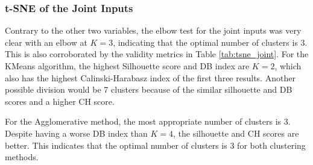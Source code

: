 
\subsubsection{t-SNE of the Joint Inputs}\label{sec:tsne_joint}
Contrary to the other two variables, the elbow test for the joint inputs was very clear with an elbow at $K=3$, indicating that the optimal number of clusters is 3. This is also corroborated by the validity metrics in Table \ref{tab:tsne_joint}. For the KMeans algorithm, the highest Silhouette score and DB index are $K=2$, which also has the highest Calinski-Harabasz index of the first three results. Another possible division would be 7 clusters because of the similar silhouette and DB scores and a higher CH score. 


For the Agglomerative method, the most appropriate number of clusters is 3. Despite having a worse DB index than $K=4$, the silhouette and CH scores are better. This indicates that the optimal number of clusters is 3 for both clustering methods.


